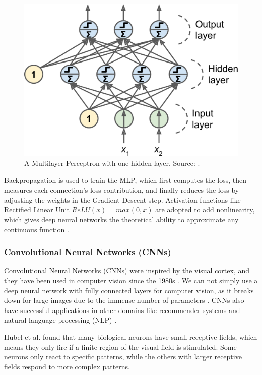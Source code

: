 \documentclass[a4paper, 11pt, oneside]{article}
\begin{document}
\begin{figure}[ht]
  \begin{center}
    \includegraphics[width=.5\textwidth]{mlp.png}
  \end{center}
  \caption{A Multilayer Perceptron with one hidden layer. Source: \cite{geron2019hands}.}
\end{figure}

Backpropagation \cite{rumelhart1985learning} is used to train the MLP, which first computes the loss, then measures each
connection's loss contribution, and finally reduces the loss by adjusting the weights in the Gradient Descent
\cite{ruder2016overview} step. Activation functions like Rectified Linear Unit $ReLU(x) = max(0, x)$ are adopted to add
nonlinearity, which gives deep neural networks the theoretical ability to approximate any continuous function
\cite{geron2019hands}.

\subsubsection{Convolutional Neural Networks (CNNs)}

\label{sec:cnn}

Convolutional Neural Networks (CNNs) \cite{lecun1989backpropagation} were inspired by the visual cortex, and they have
been used in computer vision since the 1980s \cite{geron2019hands}. We can not simply use a deep neural
network with fully connected layers for computer vision, as it breaks down for large images due to the immense
number of parameters \cite{geron2019hands}. CNNs also have successful applications in other domains like recommender
systems \cite{van2013deep} and natural language processing (NLP) \cite{collobert2008unified}.

Hubel et al. \cite{hubel1959single, hubel1959receptive, hubel1968receptive} found that many biological neurons have
small receptive fields, which means they only fire if a finite region of the visual field is stimulated. Some neurons
only react to specific patterns, while the others with larger receptive fields respond to more complex patterns.
\end{document}
